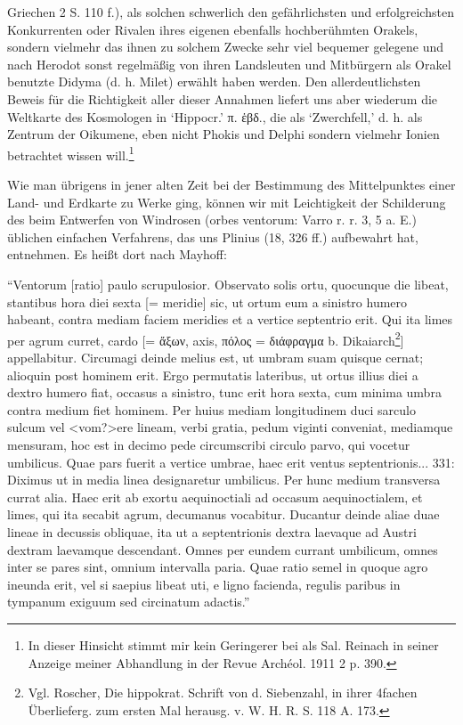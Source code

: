 \documentclass[a4paper, 11pt, oneside]{article}
\begin{document}
Griechen 2 S. 110 f.), als solchen schwerlich den gefährlichsten und erfolgreichsten Konkurrenten oder Rivalen ihres eigenen ebenfalls hochberühmten Orakels, sondern vielmehr das ihnen zu solchem Zwecke sehr viel bequemer gelegene und nach Herodot sonst regelmäßig von ihren Landsleuten und Mitbürgern als Orakel benutzte Didyma (d. h. Milet) erwählt haben werden. Den allerdeutlichsten Beweis für die Richtigkeit aller dieser Annahmen liefert uns aber wiederum die Weltkarte des Kosmologen in `Hippocr.' π. ἑβδ., die als `Zwerchfell,' d. h. als Zentrum der Oikumene, eben nicht Phokis und Delphi sondern vielmehr Ionien betrachtet wissen will.\footnote{In dieser Hinsicht stimmt mir kein Geringerer bei als Sal. Reinach in seiner Anzeige meiner Abhandlung in der Revue Archéol. 1911 2 p. 390.}

Wie man übrigens in jener alten Zeit bei der Bestimmung des Mittelpunktes einer Land- und Erdkarte zu Werke ging, können wir mit Leichtigkeit der Schilderung des beim Entwerfen von Windrosen (orbes ventorum: Varro r. r. 3, 5 a. E.) üblichen einfachen Verfahrens, das uns Plinius (18, 326 ff.) aufbewahrt hat, entnehmen. Es heißt dort nach Mayhoff:

"`Ventorum [ratio] paulo scrupulosior. Observato solis ortu, quocunque die libeat, stantibus hora diei sexta [= meridie] sic, ut ortum eum a sinistro humero habeant, contra mediam faciem meridies et a vertice septentrio erit. Qui ita limes per agrum curret, cardo [= ἄξων, axis, πόλος = διάφραγμα b. Dikaiarch\footnote{Vgl. Roscher, Die hippokrat. Schrift von d. Siebenzahl, in ihrer 4fachen Überlieferg. zum ersten Mal herausg. v. W. H. R. S. 118 A. 173.}] appellabitur. Circumagi deinde melius est, ut umbram suam quisque cernat; alioquin post hominem erit. Ergo permutatis lateribus, ut ortus illius diei a dextro humero fiat, occasus a sinistro, tunc erit hora sexta, cum minima umbra contra medium fiet hominem. Per huius mediam longitudinem duci sarculo sulcum vel <vom?>ere lineam, verbi gratia, pedum viginti conveniat, mediamque mensuram, hoc est in decimo pede circumscribi circulo parvo, qui vocetur umbilicus. Quae pars fuerit a vertice umbrae, haec erit ventus septentrionis... 331: Diximus ut in media linea designaretur umbilicus. Per hunc medium transversa currat alia. Haec erit ab exortu aequinoctiali ad occasum aequinoctialem, et limes, qui ita secabit agrum, decumanus vocabitur. Ducantur deinde aliae duae lineae in decussis obliquae, ita ut a septentrionis dextra laevaque ad Austri dextram laevamque descendant. Omnes per eundem currant umbilicum, omnes inter se pares sint, omnium intervalla paria. Quae ratio semel in quoque agro ineunda erit, vel si saepius libeat uti, e ligno facienda, regulis paribus in tympanum exiguum sed circinatum adactis."'
\end{document}

